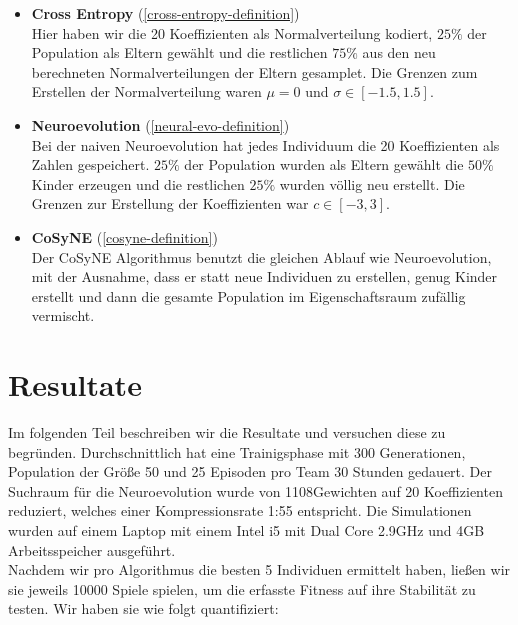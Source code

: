         \begin{itemize}
            \setlength\itemsep{1em}
            \item \textbf{Cross Entropy} (\ref{cross-entropy-definition}) \\
            Hier haben wir die 20 Koeffizienten als Normalverteilung kodiert, $25\%$ der Population als Eltern gewählt und die restlichen $75\%$ aus den neu berechneten Normalverteilungen der Eltern gesamplet. Die Grenzen zum Erstellen der Normalverteilung waren $\mu = 0$ und $\sigma \in [-1.5,1.5]$.

            \item \textbf{Neuroevolution} (\ref{neural-evo-definition}) \\
            Bei der naiven Neuroevolution hat jedes Individuum die 20 Koeffizienten als Zahlen gespeichert. $25\%$ der Population wurden als Eltern gewählt die $50\%$ Kinder erzeugen und die restlichen $25\%$ wurden völlig neu erstellt. Die Grenzen zur Erstellung der Koeffizienten war $c \in [-3,3]$.

            \item \textbf{CoSyNE} (\ref{cosyne-definition}) \\
            Der CoSyNE Algorithmus benutzt die gleichen Ablauf wie Neuroevolution, mit der Ausnahme, dass er statt neue Individuen zu erstellen, genug Kinder erstellt und dann die gesamte Population im Eigenschaftsraum zufällig vermischt.

        \end{itemize}

\newpage

    \section{Resultate}
        Im folgenden Teil beschreiben wir die Resultate und versuchen diese zu begründen. Durchschnittlich hat eine Trainigsphase mit 300 Generationen, Population der Größe 50 und 25 Episoden pro Team 30 Stunden gedauert. Der Suchraum für die Neuroevolution wurde von 1108Gewichten auf 20 Koeffizienten reduziert, welches einer Kompressionsrate 1:55 entspricht. Die Simulationen wurden auf einem Laptop mit einem Intel i5 mit Dual Core 2.9GHz und 4GB Arbeitsspeicher ausgeführt.\\[2mm]
        \noindent
        Nachdem wir pro Algorithmus die besten 5 Individuen ermittelt haben, ließen wir sie jeweils 10000 Spiele spielen, um die erfasste Fitness auf ihre Stabilität zu testen. Wir haben sie wie folgt quantifiziert:\\[2mm]

